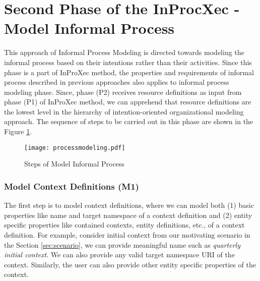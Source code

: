 \section{Second Phase of the InProcXec - Model Informal Process}
\label{sec:informalprocessmodeling}
This approach of Informal Process Modeling is directed towards modeling the informal process based on their intentions rather than their activities.  Since this phase is a part of InProXec method, the properties and requirements of informal process described in previous approaches \cite{Sungur2014a,Sungur2015} also applies to informal process modeling phase. Since, phase (P2) receives resource definitions as input from phase (P1) of InProXec method, we can apprehend that resource definitions are the lowest level in the hierarchy of intention-oriented organizational modeling approach. The sequence of steps to be carried out in this phase are shown in the Figure \ref{fig:processdiagram}. 

\begin{figure}
	\centering
	\texttt{[image: processmodeling.pdf]}
	\caption{Steps of Model Informal Process}
	\label{fig:processdiagram}
\end{figure}

\subsubsection{Model Context Definitions (M1)}  
The first step is to model context definitions, where we can model both (1) basic properties like name and target namespace of a context definition and (2) entity specific properties like contained contexts, entity definitions, etc., of a context definition. For example, consider initial context from our motivating scenario in the Section \ref{sec:scenario}, we can provide meaningful name such as \textit{quarterly initial context}. We can also provide any valid target namespace URI of the context. Similarly, the user can also provide other entity specific properties of the context. 

